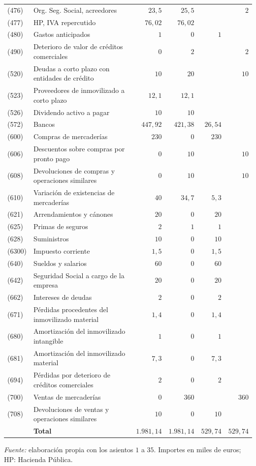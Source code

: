 \documentclass[10pt,a4paper]{article}
\begin{document}
\begin{center}
\begin{minipage}{\linewidth}
{\begin{tabular}{l p{6.6cm} r r r r}
(476) & \raggedright Org. Seg. Social, acreedores & $23,5$ & $25,5$ &  & $2$ \tabularnewline
(477) & \raggedright HP, IVA repercutido & $76,02$ & $76,02$ &  &  \tabularnewline
(480) & \raggedright Gastos anticipados & $1$ & $0$ & $1$ &  \tabularnewline
(490) & \raggedright Deterioro de valor de créditos comerciales & $0$ & $2$ &  & $2$ \tabularnewline
(520) & \raggedright Deudas a corto plazo con entidades de crédito & $10$ & $20$ &  & $10$ \tabularnewline
(523) & \raggedright Proveedores de inmovilizado a corto plazo & $12,1$ & $12,1$ &  &  \tabularnewline
(526) & \raggedright Dividendo activo a pagar & $10$ & $10$ &  &  \tabularnewline
(572) & \raggedright Bancos & $447,92$ & $421,38$ & $26,54$ &  \tabularnewline
(600) & \raggedright Compras de mercaderías & $230$ & $0$ & $230$ &  \tabularnewline
(606) & \raggedright Descuentos sobre compras por pronto pago & $0$ & $10$ &  & $10$ \tabularnewline
(608) & \raggedright Devoluciones de compras y operaciones similares & $0$ & $10$ &  & $10$ \tabularnewline
(610) & \raggedright Variación de existencias de mercaderías & $40$ & $34,7$ & $5,3$ &  \tabularnewline
(621) & \raggedright Arrendamientos y cánones & $20$ & $0$ & $20$ &  \tabularnewline
(625) & \raggedright Primas de seguros & $2$ & $1$ & $1$ &  \tabularnewline
(628) & \raggedright Suministros & $10$ & $0$ & $10$ &  \tabularnewline
(6300) & \raggedright Impuesto corriente & $1,5$ & $0$ & $1,5$ &  \tabularnewline
(640) & \raggedright Sueldos y salarios & $60$ & $0$ & $60$ &  \tabularnewline
(642) & \raggedright Seguridad Social a cargo de la empresa & $20$ & $0$ & $20$ &  \tabularnewline
(662) & \raggedright Intereses de deudas & $2$ & $0$ & $2$ &  \tabularnewline
(671) & \raggedright Pérdidas procedentes del inmovilizado material & $1,4$ & $0$ & $1,4$ &  \tabularnewline
(680) & \raggedright Amortización del inmovilizado intangible & $1$ & $0$ & $1$ &  \tabularnewline
(681) & \raggedright Amortización del inmovilizado material & $7,3$ & $0$ & $7,3$ &  \tabularnewline
(694) & \raggedright Pérdidas por deterioro de créditos comerciales & $2$ & $0$ & $2$ &  \tabularnewline
(700) & \raggedright Ventas de mercaderías & $0$ & $360$ &  & $360$ \tabularnewline
(708) & \raggedright Devoluciones de ventas y operaciones similares & $10$ & $0$ & $10$ &  \tabularnewline
\hline
 & \textbf{Total} & $1{.}981,14$ & $1{.}981,14$ & $529,74$ & $529,74$ \tabularnewline
\hline
\end{tabular}}\par\vspace{0.3em}
{\small\textit{Fuente: }elaboración propia con los asientos $1$ a $35$. Importes en miles de euros; HP: Hacienda Pública.}
\end{minipage}\end{center}
\end{document}
